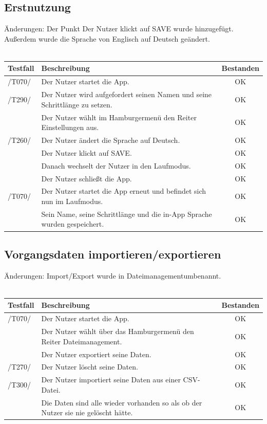 \documentclass[a4paper,12pt]{article}
\newcommand{\testok}[0]{
	\cellcolor{green!25} OK
}
\begin{document}
\subsection{Erstnutzung}
Änderungen: Der Punkt \glqq Der Nutzer klickt auf SAVE\grqq{} wurde hinzugefügt. Außerdem wurde die Sprache von Englisch auf Deutsch geändert.
\\
\\
\begin{tabular}{ |p{1.5cm} | p{12cm} | c| }
	\hline
	\textbf{Testfall} & \textbf{Beschreibung} & \textbf{Bestanden}\\
	\hline
	/T070/ & Der Nutzer startet die App. & \testok \\
	\hline
	/T290/ & Der Nutzer wird aufgefordert seinen Namen und seine Schrittlänge zu setzen. & \testok  \\
	\hline
	& Der Nutzer wählt im Hamburgermenü den Reiter Einstellungen aus. & \testok  \\
	\hline
	/T260/ & Der Nutzer ändert die Sprache auf Deutsch. & \testok  \\
	\hline
	& Der Nutzer klickt auf \glqq SAVE\grqq . & \testok  \\
	\hline
	& Danach wechselt der Nutzer in den \glqq Laufmodus\grqq . & \testok  \\
	\hline
	& Der Nutzer schließt die App. & \testok  \\
	\hline
	/T070/ & Der Nutzer startet die App erneut und befindet sich nun im \glqq Laufmodus\grqq . & \testok  \\
	\hline	
	& Sein Name, seine Schrittlänge und die in-App Sprache wurden gespeichert. & \testok  \\
	\hline
\end{tabular}



\subsection{Vorgangsdaten importieren/exportieren}
Änderungen: \glqq Import/Export\grqq{} wurde in \glqq Dateimanagement\grqq umbenannt.
\\
\\
\begin{tabular}{ |p{1.5cm} | p{12cm} | c| }
	\hline
	\textbf{Testfall} & \textbf{Beschreibung} & \textbf{Bestanden}\\
	\hline
	/T070/ & Der Nutzer startet die App. & \testok \\
	\hline
	& Der Nutzer wählt über das Hamburgermenü den Reiter \glqq Dateimanagement\grqq . & \testok  \\
	\hline
	& Der Nutzer exportiert seine Daten. & \testok \\
	\hline
	/T270/ & Der Nutzer löscht seine Daten. & \testok \\
	\hline
	/T300/ & Der Nutzer importiert seine Daten aus einer CSV-Datei. & \testok \\
	\hline
	& Die Daten sind alle wieder vorhanden so als ob der Nutzer sie nie gelöscht hätte. & \testok \\
	\hline
\end{tabular}
\end{document}
